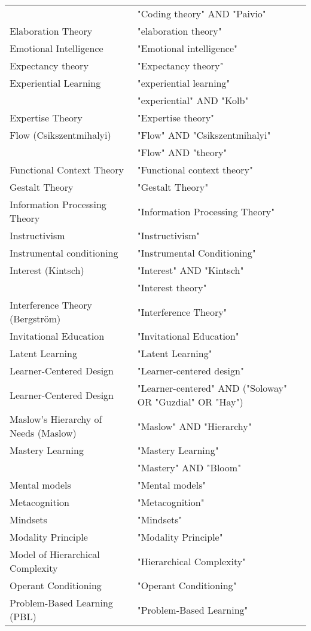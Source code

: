 \begin{table*}[t]
\begin{tabular}{ll}
 & "Coding theory" AND "Paivio"\\
Elaboration Theory & "elaboration theory"\\
Emotional Intelligence & "Emotional intelligence"\\
Expectancy theory & "Expectancy theory"\\
Experiential Learning & "experiential learning"\\
 & "experiential" AND "Kolb"\\
Expertise Theory & "Expertise theory"\\
Flow (Csikszentmihalyi) & "Flow" AND "Csikszentmihalyi"\\
 & "Flow" AND "theory"\\
Functional Context Theory & "Functional context theory"\\
Gestalt Theory & "Gestalt Theory"\\
Information Processing Theory & "Information Processing Theory"\\
Instructivism & "Instructivism"\\
Instrumental conditioning & "Instrumental Conditioning"\\
Interest (Kintsch) & "Interest" AND "Kintsch"\\
 & "Interest theory"\\
Interference Theory (Bergström) & "Interference Theory"\\
Invitational Education & "Invitational Education"\\
Latent Learning & "Latent Learning"\\
Learner-Centered Design & "Learner-centered design"\\
Learner-Centered Design  & "Learner-centered" AND ("Soloway" OR "Guzdial" OR "Hay")\\
Maslow’s Hierarchy of Needs (Maslow) & "Maslow" AND "Hierarchy"\\
Mastery Learning & "Mastery Learning"\\
 & "Mastery" AND "Bloom"\\
Mental models & "Mental models"\\
Metacognition & "Metacognition"\\
Mindsets & "Mindsets"\\
Modality Principle & "Modality Principle"\\
Model of Hierarchical Complexity & "Hierarchical Complexity"\\
Operant Conditioning & "Operant Conditioning"\\
Problem-Based Learning (PBL) & "Problem-Based Learning"\\

\end{tabular}
\end{table*}
